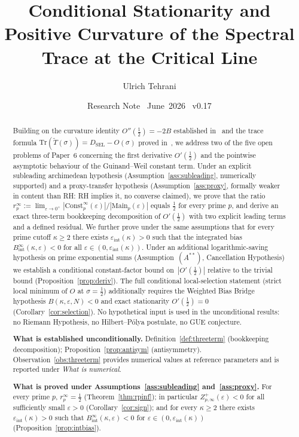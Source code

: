 \documentclass[11pt]{article}
\title{\vspace{-1.5em}\bfseries Conditional Stationarity and Positive
Curvature of the Spectral Trace at the Critical Line}
\author{Ulrich Tehrani}
\date{Research Note \textperiodcentered\ June~2026
      \textperiodcentered\ v0.17}
\newcommand{\Tt}{\widetilde{T}}
\newcommand{\DSEL}{D_{\mathrm{SEL}}}
\newcommand{\Astar}{\ensuremath{(A^{**})}}  %
\begin{document}
\maketitle

\begin{abstract}
Building on the curvature identity $O''(\tfrac12)=-2B$ established
in~\cite{Paper6} and the trace formula $\mathrm{Tr}(\Tt(\sigma))=\DSEL-O(\sigma)$
proved in~\cite{Paper5}, we address two of the five open problems
of Paper~6 concerning the first derivative $O'(\tfrac12)$ and the
pointwise asymptotic behaviour of the Guinand--Weil constant term.
Under an explicit subleading archimedean hypothesis
(Assumption~\ref{ass:subleading}, numerically supported) and a
proxy-transfer hypothesis (Assumption~\ref{ass:proxy},
formally weaker in content than RH: RH implies it, no converse claimed),
we prove that the ratio $r_p^\infty := \lim_{\varepsilon\to 0^+}
|\mathrm{Const}_p^\infty(\varepsilon)|/|\mathrm{Main}_p(\varepsilon)|$ equals
$\tfrac12$ for every prime $p$, and derive an exact
three-term bookkeeping decomposition of $O'(\tfrac12)$
with two explicit leading terms and a defined residual.
We further prove under the same assumptions that for every prime cutoff
$\kappa\ge 2$ there exists $\varepsilon_{\mathrm{int}}(\kappa)>0$ such that the
integrated bias $B_{\mathrm{int}}^\infty(\kappa,\varepsilon)<0$ for all
$\varepsilon\in(0,\varepsilon_{\mathrm{int}}(\kappa))$.
Under an additional logarithmic-saving hypothesis on prime exponential sums
(Assumption~\Astar, Cancellation Hypothesis) we establish a conditional
constant-factor bound on~$|O'(\tfrac12)|$ relative to the trivial bound
(Proposition~\ref{prop:deriv}).
The full conditional local-selection statement (strict local minimum of
$O$ at $\sigma=\tfrac12$) additionally requires the Weighted Bias Bridge
hypothesis $B(\kappa,\varepsilon,N)<0$ and exact stationarity
$O'(\tfrac12)=0$ (Corollary~\ref{cor:selection}).
No hypothetical input is used in the unconditional results: no Riemann
Hypothesis, no Hilbert--P\'olya postulate, no GUE conjecture.

\textbf{What is established unconditionally.}
Definition~\ref{def:threeterm} (bookkeeping decomposition);
Proposition~\ref{prop:antisym} (antisymmetry).
Observation~\ref{obs:threeterm} provides numerical values at
reference parameters and is reported under \emph{What is numerical}.

\textbf{What is proved under Assumptions~\ref{ass:subleading} and~\ref{ass:proxy}.}
For every prime $p$, $r_p^\infty = \tfrac12$ (Theorem~\ref{thm:rpinf});
in particular $Z_{p,\infty}^+(\varepsilon)<0$ for all sufficiently small
$\varepsilon>0$ (Corollary~\ref{cor:sign});
and for every $\kappa\ge 2$ there exists $\varepsilon_{\mathrm{int}}(\kappa)>0$
such that $B_{\mathrm{int}}^\infty(\kappa,\varepsilon)<0$ for
$\varepsilon\in(0,\varepsilon_{\mathrm{int}}(\kappa))$
(Proposition~\ref{prop:intbias}).


\end{abstract}
\end{document}
